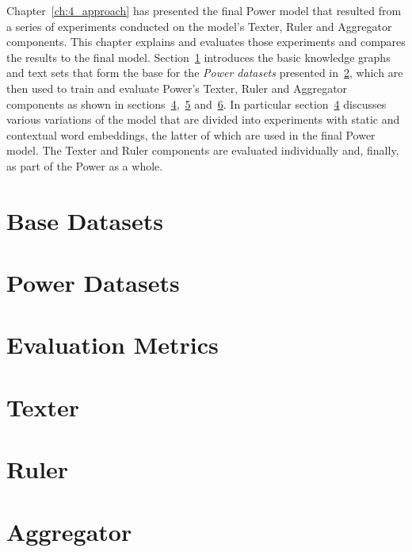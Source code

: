 Chapter~\ref{ch:4_approach} has presented the final Power model that resulted from a series of experiments conducted on the model's Texter, Ruler and Aggregator components. This chapter explains and evaluates those experiments and compares the results to the final model. Section~\ref{sec:5_experiments/1_base_datasets} introduces the basic knowledge graphs and text sets that form the base for the \emph{Power datasets} presented in~\ref{sec:5_experiments/2_power_datasets}, which are then used to train and evaluate Power's Texter, Ruler and Aggregator components as shown in sections~\ref{sec:5_experiments/4_texter},~\ref{sec:5_experiments/5_ruler} and~\ref{sec:5_experiments/6_aggregator}.
In particular section~\ref{sec:5_experiments/4_texter} discusses various variations of the model that are divided into experiments with static and contextual word embeddings, the latter of which are used in the final Power model. The Texter and Ruler components are evaluated individually and, finally, as part of the Power as a whole.


\section{Base Datasets}
\label{sec:5_experiments/1_base_datasets}



\section{Power Datasets}
\label{sec:5_experiments/2_power_datasets}



\section{Evaluation Metrics}
\label{sec:5_experiments/3_metrics}



\section{Texter}
\label{sec:5_experiments/4_texter}



\section{Ruler}
\label{sec:5_experiments/5_ruler}



\section{Aggregator}
\label{sec:5_experiments/6_aggregator}

